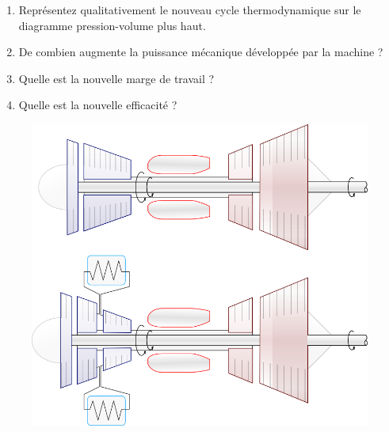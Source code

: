 	\begin{enumerate}
		\item Représentez qualitativement le nouveau cycle thermodynamique sur le diagramme pression-volume plus haut.
		\item De combien augmente la puissance mécanique développée par la machine ?
		\item Quelle est la nouvelle marge de travail ?
		\item Quelle est la nouvelle efficacité ?
	\end{enumerate}
	
	\onlyframabook{\pagebreak}%
	\begin{figure}[htc!]%
		\begin{center}
		\includegraphics[width=12cm]{images/circuit_turboshaft_exercice.png}
		\end{center}
		\label{fig_turbomoteurs_exercice}
	\end{figure}

\exercisesolutionpage
\titreresultats
	
